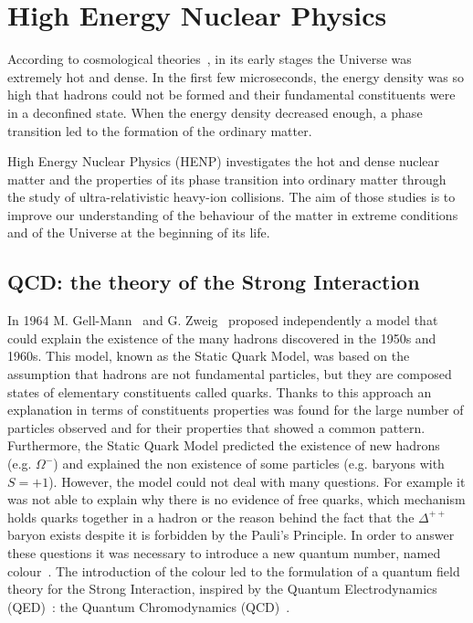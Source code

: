 %
\chapter{High Energy Nuclear Physics}
\label{sec:1}


According to cosmological theories~\cite{cosm1,cosm2,cosm3,cosm4}, in its early stages the 
Universe was extremely hot and dense. 
In the first few microseconds, the energy density was so high that hadrons could not be formed and
their fundamental constituents were in a deconfined state. When the energy density decreased enough,
a phase transition led to the formation of the ordinary matter. 

High Energy Nuclear Physics (HENP) investigates the hot and dense nuclear matter and the properties
of its phase transition into ordinary matter through the study of ultra-relativistic heavy-ion
collisions. 
The aim of those studies is to improve our understanding of the behaviour of the matter in extreme
conditions and of the Universe at the beginning of its life.

\section{QCD: the theory of the Strong Interaction}
\label{sec:1.1}

In 1964 M. Gell-Mann~\cite{gellmann} and G. Zweig~\cite{zweig1, zweig2} proposed independently a model
that could explain the existence of the many hadrons discovered in the 1950s and 1960s. 
This model, known as the Static Quark Model, was based on the assumption that hadrons are not
fundamental particles, but they are composed states of elementary constituents called quarks.
Thanks to this approach an explanation in terms of constituents properties was found for the large 
number of particles observed and for their properties that showed a common pattern.
Furthermore, the Static Quark Model predicted the existence of new hadrons (e.g. 
$\Omega^{-}\xspace$) and explained the non existence of some particles (e.g. baryons with $S=+1$).
However, the model could not deal with many questions. For example it was not able to explain why there
is no evidence of free quarks, which mechanism holds quarks together in a hadron or the reason behind
the fact that the $\Delta^{++}$ baryon exists despite it is forbidden by the Pauli's Principle.
In order to answer these questions it was necessary to introduce a new quantum number, named 
colour~\cite{fritzsch-gellmann}. The introduction of the colour led to the formulation of a
quantum field theory for the Strong Interaction, inspired by the Quantum
Electrodynamics (QED)~\cite{peskin}: the Quantum Chromodynamics (QCD)~\cite{peskin}.

